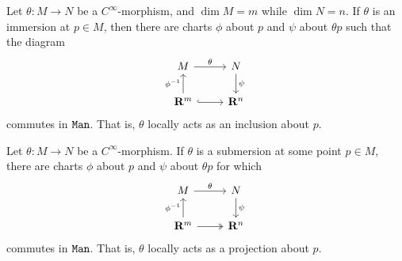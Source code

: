 \begin{theorem}[Immersion]
    \label{thm:immersion-rank-theorem}
    Let \(\theta: M \to N\) be a \(C^{\infty}\)-morphism, and \(\dim M = m\) while
    \(\dim N = n\). If \(\theta\) is an immersion at \(p \in M\), then there are
    charts \(\phi\) about \(p\) and \(\psi\) about \(\theta p\) such that the
    diagram
    \[
        \begin{tikzcd}
            M \ar[r, "\theta"] &N \ar[d, "\psi"] \\
            \R^m \ar[u, "\phi^{-1}"] \ar[r, hook] &\R^n
        \end{tikzcd}
    \]
    commutes in \({\texttt{Man}}\). That is, \(\theta\) locally acts as an inclusion about
    \(p\).
\end{theorem}


\begin{theorem}
    \label{thm:submersion}
    Let \(\theta: M \to N\) be a \(C^{\infty}\)-morphism. If \(\theta\) is a
    submersion at some point \(p \in M\), there are charts \(\phi\) about \(p\) and
    \(\psi\) about \(\theta p\) for which
    \[
        \begin{tikzcd}
            M \ar[r, "\theta"] &N \ar[d, "\psi"] \\
            \R^m \ar[u, "\phi^{-1}"] \ar[r, two heads] &\R^n
        \end{tikzcd}
    \]
    commutes in \({\texttt{Man}}\). That is, \(\theta\) locally acts as a projection about
    \(p\).
\end{theorem}

